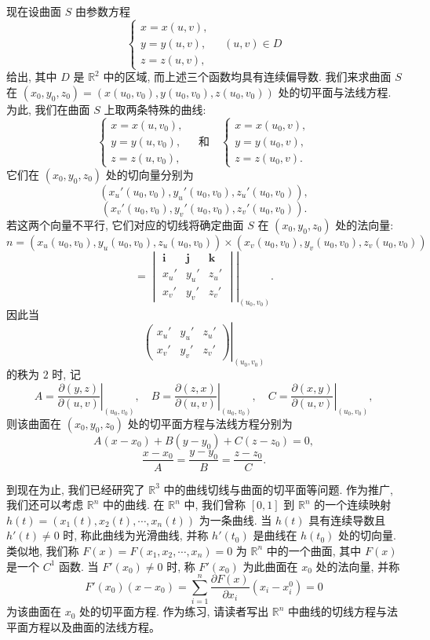 \documentclass[UTF8,12pt,a4paper,fontset=fandol]{ctexart}
\begin{document}
现在设曲面 $S$ 由参数方程
\[
  \begin{cases}
    x=x(u,v),\\
    y=y(u,v),\\
    z=z(u,v),
  \end{cases}
  \quad (u,v)\in D
\]
给出, 其中 $D$ 是 $\mathbb R^2$ 中的区域, 而上述三个函数均具有连续偏导数. 我们来求曲面 $S$ 在 $(x_0,y_0,z_0)=(x(u_0,v_0),y(u_0,v_0),z(u_0,v_0))$ 处的切平面与法线方程. 为此, 我们在曲面 $S$ 上取两条特殊的曲线:
\[
  \begin{cases}
    x=x(u,v_0),\\
    y=y(u,v_0),\\
    z=z(u,v_0),
  \end{cases}
  \quad\text{和}\quad
  \begin{cases}
    x=x(u_0,v),\\
    y=y(u_0,v),\\
    z=z(u_0,v).
  \end{cases}
\]
它们在 $(x_0,y_0,z_0)$ 处的切向量分别为
\[
  (x_u'(u_0,v_0),y_u'(u_0,v_0),z_u'(u_0,v_0)),
\]
\[
  (x_v'(u_0,v_0),y_v'(u_0,v_0),z_v'(u_0,v_0)).
\]
若这两个向量不平行, 它们对应的切线将确定曲面 $S$ 在 $(x_0,y_0,z_0)$ 处的法向量:
\[
  n=(x_u(u_0,v_0),y_u(u_0,v_0),z_u(u_0,v_0))
  \times(x_v(u_0,v_0),y_v(u_0,v_0),z_v(u_0,v_0))
\]
\[
  =
  \left.
  \begin{vmatrix}
    \mathbf i & \mathbf j & \mathbf k\\
    x_u' & y_u' & z_u'\\
    x_v' & y_v' & z_v'
  \end{vmatrix}
  \right|_{(u_0,v_0)}.
\]
因此当
\[
  \left.
  \begin{pmatrix}
    x_u' & y_u' & z_u'\\
    x_v' & y_v' & z_v'
  \end{pmatrix}
  \right|_{(u_0,v_0)}
\]
的秩为 $2$ 时, 记
\[
  A=\left.\frac{\partial(y,z)}{\partial(u,v)}\right|_{(u_0,v_0)},\quad
  B=\left.\frac{\partial(z,x)}{\partial(u,v)}\right|_{(u_0,v_0)},\quad
  C=\left.\frac{\partial(x,y)}{\partial(u,v)}\right|_{(u_0,v_0)},
\]
则该曲面在 $(x_0,y_0,z_0)$ 处的切平面方程与法线方程分别为
\[
  A(x-x_0)+B(y-y_0)+C(z-z_0)=0,
\]
\[
  \frac{x-x_0}{A}=\frac{y-y_0}{B}=\frac{z-z_0}{C}.
\]

到现在为止, 我们已经研究了 $\mathbb R^3$ 中的曲线切线与曲面的切平面等问题. 作为推广, 我们还可以考虑 $\mathbb R^n$ 中的曲线. 在 $\mathbb R^n$ 中, 我们曾称 $[0,1]$ 到 $\mathbb R^n$ 的一个连续映射 $h(t)=(x_1(t),x_2(t),\cdots,x_n(t))$ 为一条曲线. 当 $h(t)$ 具有连续导数且 $h'(t)\ne0$ 时, 称此曲线为光滑曲线, 并称 $h'(t_0)$ 是曲线在 $h(t_0)$ 处的切向量. 类似地, 我们称 $F(x)=F(x_1,x_2,\cdots,x_n)=0$ 为 $\mathbb R^n$ 中的一个曲面, 其中 $F(x)$ 是一个 $C^1$ 函数. 当 $F'(x_0)\ne0$ 时, 称 $F'(x_0)$ 为此曲面在 $x_0$ 处的法向量, 并称
\[
  F'(x_0)(x-x_0)
  =
  \sum_{i=1}^n \frac{\partial F(x)}{\partial x_i}(x_i-x_i^0)=0
\]
为该曲面在 $x_0$ 处的切平面方程. 作为练习, 请读者写出 $\mathbb R^n$ 中曲线的切线方程与法平面方程以及曲面的法线方程。
\end{document}
